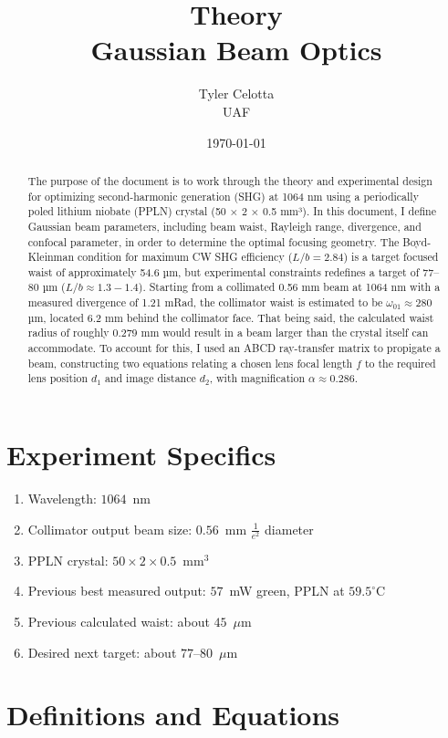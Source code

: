 \documentclass[11pt, letterpaper]{article}
\title{\textbf{Theory}\\ \large Gaussian Beam Optics}
\author{Tyler Celotta \\ UAF}
\date{\today}
\begin{document}
\maketitle
\thispagestyle{fancy}
\begin{abstract}
    The purpose of the document is to work through the theory and experimental design for optimizing second-harmonic generation (SHG) at 1064 nm using a periodically poled lithium niobate (PPLN) crystal (50 × 2 × 0.5 mm³). In this document, I define Gaussian beam parameters, including beam waist, Rayleigh range, divergence, and confocal parameter, in order to determine the optimal focusing geometry. The Boyd-Kleinman condition for maximum CW SHG efficiency ($L/b = 2.84$) is a target focused waist of approximately 54.6 µm, but experimental constraints redefines a target of 77–80 µm ($L/b \approx 1.3-1.4$). Starting from a collimated 0.56 mm beam at 1064 nm with a measured divergence of 1.21 mRad, the collimator waist is estimated to be $\omega_{01} \approx 280$ µm, located 6.2 mm behind the collimator face. That being said, the calculated waist radius of roughly 0.279 mm would result in a beam larger than the crystal itself can accommodate. To account for this, I used an ABCD ray-transfer matrix to propigate a beam, constructing two equations relating a chosen lens focal length $f$ to the required lens position $d_{1}$ and image distance $d_{2}$, with magnification $\alpha \approx 0.286$.
\end{abstract}
\section{Experiment Specifics}
\begin{enumerate}
    \item Wavelength: $1064$~nm
    \item Collimator output beam size: $0.56$~mm $\tfrac{1}{e^2}$ diameter
    \item PPLN crystal: $50 \times 2 \times 0.5$~mm$^3$
    \item Previous best measured output: $57$~mW green, PPLN at $59.5^{\circ}$C
    \item Previous calculated waist: about $45$~$\mu$m
    \item Desired next target: about $77$--$80$~$\mu$m
\end{enumerate}

\section{Definitions and Equations}
\end{document}
